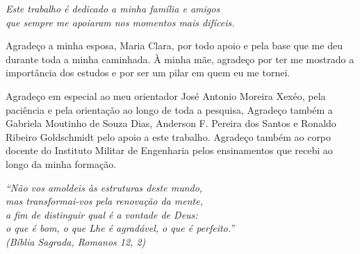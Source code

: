 \begin{dedicatoria}
   \vspace*{\fill}
   \centering
   \noindent
   \textit{Este trabalho é dedicado a minha família e amigos\\
   que sempre me apoiaram nos momentos mais difíceis.} \vspace*{\fill}
\end{dedicatoria}

\begin{agradecimentos}
Agradeço a minha esposa, Maria Clara, por todo apoio e pela base que me deu durante toda a minha caminhada. À minha mãe, agradeço por ter me mostrado a importância dos estudos e por ser um pilar em quem eu me tornei. 

Agradeço em especial ao meu orientador José Antonio Moreira Xexéo, pela paciência e pela orientação ao longo de toda a pesquisa, Agradeço também a Gabriela Moutinho de Souza Dias, Anderson F. Pereira dos Santos e Ronaldo Ribeiro Goldschmidt pelo apoio a este trabalho. 
Agradeço também ao corpo docente do Instituto Militar de Engenharia pelos ensinamentos que recebi ao longo da minha formação.


\end{agradecimentos}

\begin{epigrafe}
    \vspace*{\fill}
	\begin{flushright}
		\textit{``Não vos amoldeis às estruturas deste mundo, \\
		mas transformai-vos pela renovação da mente, \\
		a fim de distinguir qual é a vontade de Deus: \\
		o que é bom, o que Lhe é agradável, o que é perfeito.''\\
		(Bíblia Sagrada, Romanos 12, 2)}
	\end{flushright}
\end{epigrafe}


